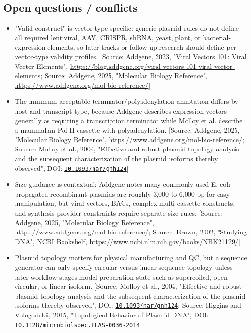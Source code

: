 \documentclass[11pt]{report}
\begin{document}
\subsection{Open questions / conflicts}
\begin{itemize}
\item "Valid construct" is vector-type-specific: generic plasmid rules do not define all required lentiviral, AAV, CRISPR, shRNA, yeast, plant, or bacterial-expression elements, so later tracks or follow-up research should define per-vector-type validity profiles. [Source: Addgene, 2023, "Viral Vectors 101: Viral Vector Elements", \url{https://blog.addgene.org/viral-vectors-101-viral-vector-elements}; Source: Addgene, 2025, "Molecular Biology Reference", \url{https://www.addgene.org/mol-bio-reference/}]
\item The minimum acceptable terminator/polyadenylation annotation differs by host and transcript type, because Addgene describes expression vectors generally as requiring a transcription terminator while Molloy et al. describe a mammalian Pol II cassette with polyadenylation. [Source: Addgene, 2025, "Molecular Biology Reference", \url{https://www.addgene.org/mol-bio-reference/}; Source: Molloy et al., 2004, "Effective and robust plasmid topology analysis and the subsequent characterization of the plasmid isoforms thereby observed", DOI: \href{https://doi.org/10.1093/nar/gnh124}{\nolinkurl{10.1093/nar/gnh124}}]
\item Size guidance is contextual: Addgene notes many commonly used E. coli-propagated recombinant plasmids are roughly 3,000 to 6,000 bp for easy manipulation, but viral vectors, BACs, complex multi-cassette constructs, and synthesis-provider constraints require separate size rules. [Source: Addgene, 2025, "Molecular Biology Reference", \url{https://www.addgene.org/mol-bio-reference/}; Source: Brown, 2002, "Studying DNA", NCBI Bookshelf, \url{https://www.ncbi.nlm.nih.gov/books/NBK21129/}]
\item Plasmid topology matters for physical manufacturing and QC, but a sequence generator can only specify circular versus linear sequence topology unless later workflow stages model preparation state such as supercoiled, open-circular, or linear isoform. [Source: Molloy et al., 2004, "Effective and robust plasmid topology analysis and the subsequent characterization of the plasmid isoforms thereby observed", DOI: \href{https://doi.org/10.1093/nar/gnh124}{\nolinkurl{10.1093/nar/gnh124}}; Source: Higgins and Vologodskii, 2015, "Topological Behavior of Plasmid DNA", DOI: \href{https://doi.org/10.1128/microbiolspec.PLAS-0036-2014}{\nolinkurl{10.1128/microbiolspec.PLAS-0036-2014}}]
\end{itemize}
\end{document}
